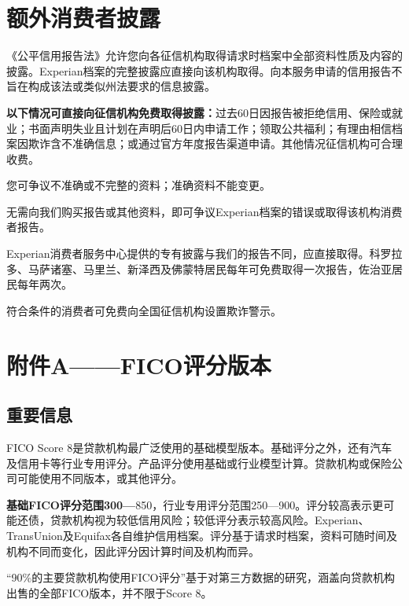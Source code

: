 \documentclass[UTF8,fontset=none,11pt,a4paper]{ctexart}
\begin{document}
\section*{额外消费者披露}
《公平信用报告法》允许您向各征信机构取得请求时档案中全部资料性质及内容的披露。Experian档案的完整披露应直接向该机构取得。向本服务申请的信用报告不旨在构成该法或类似州法要求的信息披露。


\textbf{以下情况可直接向征信机构免费取得披露：}过去60日因报告被拒绝信用、保险或就业；书面声明失业且计划在声明后60日内申请工作；领取公共福利；有理由相信档案因欺诈含不准确信息；或通过官方年度报告渠道申请。其他情况征信机构可合理收费。


您可争议不准确或不完整的资料；准确资料不能变更。


无需向我们购买报告或其他资料，即可争议Experian档案的错误或取得该机构消费者报告。


Experian消费者服务中心提供的专有披露与我们的报告不同，应直接取得。科罗拉多、马萨诸塞、马里兰、新泽西及佛蒙特居民每年可免费取得一次报告，佐治亚居民每年两次。


符合条件的消费者可免费向全国征信机构设置欺诈警示。


\section*{附件A——FICO评分版本}
\subsection*{重要信息}
FICO Score 8是贷款机构最广泛使用的基础模型版本。基础评分之外，还有汽车及信用卡等行业专用评分。产品评分使用基础或行业模型计算。贷款机构或保险公司可能使用不同版本，或其他评分。


\textbf{基础FICO评分范围300—}850，行业专用评分范围250—900。评分较高表示更可能还债，贷款机构视为较低信用风险；较低评分表示较高风险。Experian、TransUnion及Equifax各自维护信用档案。评分基于请求时档案，资料可随时间及机构不同而变化，因此评分因计算时间及机构而异。


“90\%的主要贷款机构使用FICO评分”基于对第三方数据的研究，涵盖向贷款机构出售的全部FICO版本，并不限于Score 8。
\end{document}
